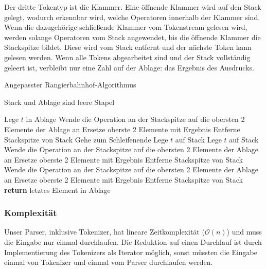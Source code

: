 Der dritte Tokentyp ist die Klammer. Eine öffnende Klammer wird auf den Stack gelegt, wodurch erkennbar wird, welche Operatoren innerhalb der Klammer sind. Wenn die dazugehörige schließende Klammer vom Tokenstream gelesen wird, werden solange Operatoren vom Stack angewendet, bis die öffnende Klammer die Stackspitze bildet. Diese wird vom Stack entfernt und der nächste Token kann gelesen werden. Wenn alle Tokens abgearbeitet sind und der Stack vollständig geleert ist, verbleibt nur eine Zahl auf der Ablage: das Ergebnis des Ausdrucks.

\begin{algorithm}[H]
\caption{Angepasster Rangierbahnhof-Algorithmus}
\label{alg:shunt}
\begin{algorithmic}
\State Stack und Ablage sind leere Stapel

    \State Lege $t$ in Ablage
            \State Wende die Operation an der Stackspitze
            \State \quad auf die obersten 2 Elemente der Ablage an
            \State Ersetze oberste 2 Elemente mit Ergebnis
            \State Entferne Stackspitze von Stack
        \Else
            \State Gehe zum Schleifenende
        \EndIf
    \EndWhile
    \State Lege $t$ auf Stack
    \State Lege $t$ auf Stack
        \State Wende die Operation an der Stackspitze
        \State \quad auf die obersten 2 Elemente der Ablage an
        \State Ersetze oberste 2 Elemente mit Ergebnis
        \State Entferne Stackspitze von Stack
    \EndWhile
\EndIf
\EndFor
{}
    \State Wende die Operation an der Stackspitze
    \State \quad auf die obersten 2 Elemente der Ablage an
    \State Ersetze oberste 2 Elemente mit Ergebnis
    \State Entferne Stackspitze von Stack
\EndWhile
\State \textbf{return} letztes Element in Ablage
\end{algorithmic}
\end{algorithm}

\subsubsection{Komplexität}

Unser Parser, inklusive Tokenizer, hat lineare Zeitkomplexität ($\mathcal{O}(n)$) und muss die Eingabe nur einmal durchlaufen. Die Reduktion auf einen Durchlauf ist durch Implementierung des Tokenizers als Iterator möglich, sonst müssten die Eingabe einmal von Tokenizer und einmal vom Parser durchlaufen werden.

